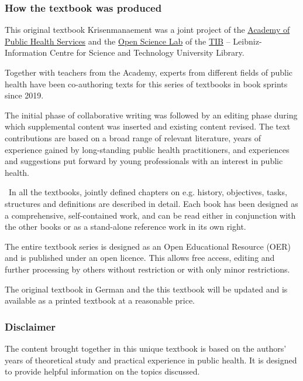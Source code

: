 \documentclass{article}
\begin{document}
\subsubsection{How the textbook was produced}\label{H691848}



This original textbook Krisenmanaement was a joint project of the \href{https://www.akademie-oegw.de/startseite.html}{Academy of Public Health Services} and the \href{https://www.tib.eu/en/research-development/open-science}{Open Science Lab} of the \href{https://www.tib.eu/}{TIB} – Leibniz-Information Centre for Science and Technology University Library.


Together with teachers from the Academy, experts from different fields of public health have been co-authoring texts for this series of textbooks in book sprints since 2019.


The initial phase of collaborative writing was followed by an editing phase during which supplemental content was inserted and existing content revised. The text contributions are based on a broad range of relevant literature, years of experience gained by long-standing public health practitioners, and experiences and suggestions put forward by young professionals with an interest in public health.


 In all the textbooks, jointly defined chapters on e.g. history, objectives, tasks, structures and definitions are described in detail. Each book has been designed as a comprehensive, self-contained work, and can be read either in conjunction with the other books or as a stand-alone reference work in its own right.


The entire textbook series is designed as an Open Educational Resource (OER) and is published under an open licence. This allows free access, editing and further processing by others without restriction or with only minor restrictions.


The original textbook in German and the this textbook will be updated and is available as a printed textbook at a reasonable price.


\subsubsection{Disclaimer}\label{H8101608}



The content brought together in this unique textbook is based on the authors' years of theoretical study and practical experience in public health. It is designed to provide helpful information on the topics discussed.
\end{document}

